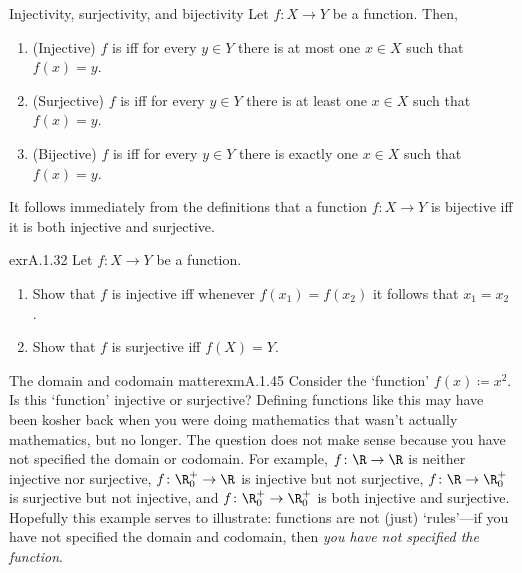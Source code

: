 \begin{dfn}{Injectivity, surjectivity, and bijectivity}{}
Let $f\colon X\rightarrow Y$ be a function.  Then,
\begin{enumerate}
\item (Injective) $f$ is  iff for every $y\in Y$ there is at most one $x\in X$ such that $f(x)=y$.
\item (Surjective) $f$ is  iff for every $y\in Y$ there is at least one $x\in X$ such that $f(x)=y$.
\item (Bijective) $f$ is  iff for every $y\in Y$ there is exactly one $x\in X$ such that $f(x)=y$.
\end{enumerate}
\begin{rmk}
It follows immediately from the definitions that a function $f\colon X\rightarrow Y$ is bijective iff it is both injective and surjective.
\end{rmk}
\end{dfn}
\begin{exr}{}{exrA.1.32}
Let $f\colon X\rightarrow Y$ be a function.
\begin{enumerate}
\item \label{exrA.1.32.i}Show that $f$ is injective iff whenever $f(x_1)=f(x_2)$ it follows that $x_1=x_2$.
\item \label{exrA.1.32.ii}Show that $f$ is surjective iff $f(X)=Y$.
\end{enumerate}
\end{exr}
\begin{exm}{The domain and codomain matter}{exmA.1.45}
Consider the `function' $f(x)\coloneqq x^2$.  Is this `function' injective or surjective?  Defining functions like this may have been kosher back when you were doing mathematics that wasn't actually mathematics, but no longer.  The question does not make sense because you have not specified the domain or codomain.  For example, $f\colon \R \rightarrow \R$ is neither injective nor surjective, $f\colon \R _0^+\rightarrow \R$ is injective but not surjective, $f\colon \R \rightarrow \R _0^+$ is surjective but not injective, and $f\colon \R _0^+\rightarrow \R _0^+$ is both injective and surjective.  Hopefully this example serves to illustrate:  functions are not (just) `rules'---if you have not specified the domain and codomain, then \emph{you have not specified the function}.
\end{exm}
